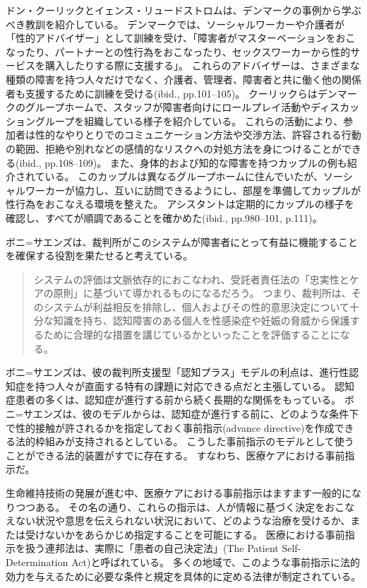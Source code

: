 \documentclass[paper=a4,book,openany]{jlreq}
\begin{document}
ドン・クーリックとイェンス・リュードストロムは、デンマークの事例から学ぶべき教訓を紹介している。
デンマークでは、ソーシャルワーカーや介護者が「性的アドバイザー」として訓練を受け、「障害者がマスターベーションをおこなったり、パートナーとの性行為をおこなったり、セックスワーカーから性的サービスを購入したりする際に支援する」\citep[p.18]{kulick15:_lonel_its_oppos}。
これらのアドバイザーは、さまざまな種類の障害を持つ人々だけでなく、介護者、管理者、障害者と共に働く他の関係者も支援するために訓練を受ける(ibid., pp.101--105)。
クーリックらはデンマークのグループホームで、スタッフが障害者向けにロールプレイ活動やディスカッショングループを組織している様子を紹介している。
これらの活動により、参加者は性的なやりとりでのコミュニケーション方法や交渉方法、許容される行動の範囲、拒絶や別れなどの感情的なリスクへの対処方法を身につけることができる(ibid., pp.108--109)。
また、身体的および知的な障害を持つカップルの例も紹介されている。
このカップルは異なるグループホームに住んでいたが、ソーシャルワーカーが協力し、互いに訪問できるようにし、部屋を準備してカップルが性行為をおこなえる環境を整えた。
アシスタントは定期的にカップルの様子を確認し、すべてが順調であることを確かめた(ibid., pp.980--101, p.111)。

ボニ=サエンズは、裁判所がこのシステムが障害者にとって有益に機能することを確保する役割を果たせると考えている。

\begin{quote}
システムの評価は文脈依存的におこなわれ、受託者責任法の「忠実性とケアの原則」に基づいて導かれるものになるだろう。
つまり、裁判所は、そのシステムが利益相反を排除し、個人およびその性的意思決定について十分な知識を持ち、認知障害のある個人を性感染症や妊娠の脅威から保護するために合理的な措置を講じているかといったことを評価することになる。
\citep[p.1234]{boni-saenz15:_sexual_incap}
\end{quote}

ボニ=サエンズは、彼の裁判所支援型「認知プラス」モデルの利点は、進行性認知症を持つ人々が直面する特有の課題に対応できる点だと主張している。
認知症患者の多くは、認知症が進行する前から続く長期的な関係をもっている。
ボニ=サエンズは、彼のモデルからは、認知症が進行する前に、どのような条件下で性的接触が許されるかを指定しておく事前指示(advance directive)を作成できる法的枠組みが支持されるとしている。
こうした事前指示のモデルとして使うことができる法的装置がすでに存在する。
すなわち、医療ケアにおける事前指示だ。

生命維持技術の発展が進む中、医療ケアにおける事前指示はますます一般的になりつつある。
その名の通り、これらの指示は、人が情報に基づく決定をおこなえない状況や意思を伝えられない状況において、どのような治療を受けるか、または受けないかをあらかじめ指定することを可能にする。
医療における事前指示を扱う連邦法は、実際に「患者の自己決定法」(The Patient Self-Determination Act)と呼ばれている。
多くの地域で、このような事前指示に法的効力を与えるために必要な条件と規定を具体的に定める法律が制定されている\citep[cf.][]{srebnik99:_advan_direc_mental_healt_treat}。
\end{document}
